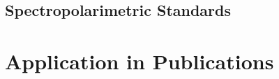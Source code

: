 \subsection{Spectropolarimetric Standards}





\section{Application in Publications} \label{sec:results_pub}


